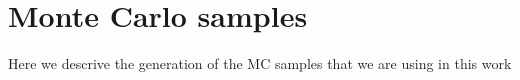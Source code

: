 \section{Monte Carlo samples}

Here we descrive the generation of the MC samples that
we are using in this work
